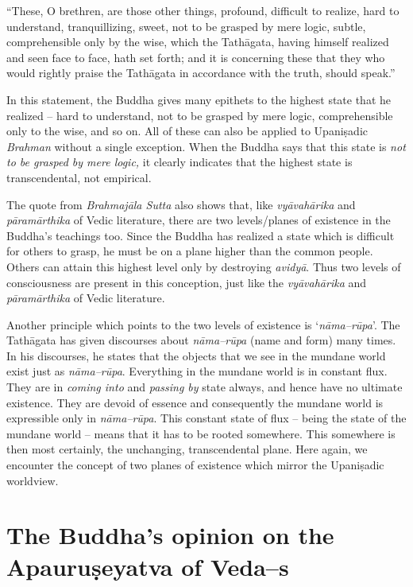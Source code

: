 \begin{myquote}
“These, O brethren, are those other things, profound, difficult to realize, hard to understand, tranquillizing, sweet, not to be grasped by mere logic, subtle, comprehensible only by the wise, which the Tathāgata, having himself realized and seen face to face, hath set forth; and it is concerning these that they who would rightly praise the Tathāgata in accordance with the truth, should speak.”
\end{myquote}

In this statement, the Buddha gives many epithets to the highest state that he realized – hard to understand, not to be grasped by mere logic, comprehensible only to the wise, and so on. All of these can also be applied to Upaniṣadic \textit{Brahman} without a single exception. When the Buddha says that this state is \textit{not to be grasped by mere logic,} it clearly indicates that the highest state is transcendental, not empirical.

The quote from \textit{Brahmajāla Sutta} also shows that, like \textit{vyāvahārika} and \textit{pāramārthika} of Vedic literature, there are two levels/planes of existence in the Buddha’s teachings too. Since the Buddha has realized a state which is difficult for others to grasp, he must be on a plane higher than the common people. Others can attain this highest level only by destroying \textit{avidyā}. Thus two levels of consciousness are present in this conception, just like the \textit{vyāvahārika} and \textit{pāramārthika} of Vedic literature.

Another principle which points to the two levels of existence is ‘\textit{nāma–rūpa}’. The Tathāgata has given discourses about \textit{nāma–rūpa} (name and form) many times. In his discourses, he states that the objects that we see in the mundane world exist just as \textit{nāma–rūpa}. Everything in the mundane world is in constant flux. They are in \textit{coming into} and \textit{passing by} state always, and hence have no ultimate existence. They are devoid of essence and consequently the mundane world is expressible only in \textit{nāma–rūpa}. This constant state of flux – being the state of the mundane world – means that it has to be rooted somewhere. This somewhere is then most certainly, the unchanging, transcendental plane. Here again, we encounter the concept of two planes of existence which mirror the Upaniṣadic worldview.


\section*{The Buddha’s opinion on the Apauruṣeyatva of Veda–s}

